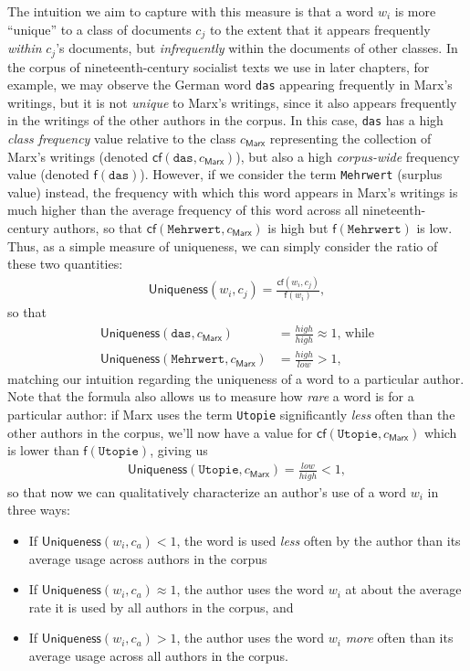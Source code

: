 \documentclass[11pt]{article}
\newcommand{\dett}[1]{\texttt{#1}}
\begin{document}
The intuition we aim to capture with this measure is that a word $w_i$ is more ``unique'' to a class of documents $c_j$ to the extent that it appears frequently \textit{within} $c_j$'s documents, but \textit{infrequently} within the documents of other classes. In the corpus of nineteenth-century socialist texts we use in later chapters, for example, we may observe the German word \dett{das} appearing frequently in Marx's writings, but it is not \textit{unique} to Marx's writings, since it also appears frequently in the writings of the other authors in the corpus. In this case, \dett{das} has a high \textit{class frequency} value relative to the class $c_\textsf{Marx}$ representing the collection of Marx's writings (denoted $\textsf{cf}(\dett{das}, c_\textsf{Marx})$), but also a high \textit{corpus-wide} frequency value (denoted $\textsf{f}(\dett{das})$). However, if we consider the term \dett{Mehrwert} (surplus value) instead, the frequency with which this word appears in Marx's writings is much higher than the average frequency of this word across all nineteenth-century authors, so that $\textsf{cf}(\dett{Mehrwert}, c_\textsf{Marx})$ is high but $\textsf{f}(\dett{Mehrwert})$ is low. Thus, as a simple measure of uniqueness, we can simply consider the ratio of these two quantities:
\begin{align*}
\textsf{Uniqueness}(w_i,c_j) = \frac{\textsf{cf}(w_i,c_j)}{\textsf{f}(w_i)},
\end{align*}
so that
\begin{align*}
\textsf{Uniqueness}(\dett{das}, c_\textsf{Marx}) &= \frac{high}{high} \approx 1\text{, while} \\
\textsf{Uniqueness}(\dett{Mehrwert}, c_\textsf{Marx}) &= \frac{high}{low} > 1,
\end{align*}
matching our intuition regarding the uniqueness of a word to a particular author. Note that the formula also allows us to measure how \textit{rare} a word is for a particular author: if Marx uses the term \dett{Utopie} significantly \textit{less} often than the other authors in the corpus, we'll now have a value for $\textsf{cf}(\dett{Utopie}, c_\textsf{Marx})$ which is lower than $\textsf{f}(\dett{Utopie})$, giving us
\begin{align*}
\textsf{Uniqueness}(\dett{Utopie}, c_\textsf{Marx}) = \frac{low}{high} < 1,
\end{align*}
so that now we can qualitatively characterize an author's use of a word $w_i$ in three ways:
\begin{itemize}
	\item If $\textsf{Uniqueness}(w_i, c_a) < 1$, the word is used \textit{less} often by the author than its average usage across authors in the corpus
	\item If $\textsf{Uniqueness}(w_i, c_a) \approx 1$, the author uses the word $w_i$ at about the average rate it is used by all authors in the corpus, and
	\item If $\textsf{Uniqueness}(w_i, c_a) > 1$, the author uses the word $w_i$ \textit{more} often than its average usage across all authors in the corpus.
\end{itemize}
\end{document}
